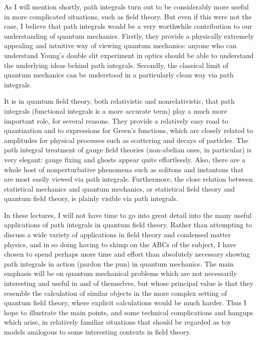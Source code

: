 \documentclass[12pt]{article}
\begin{document}
As I will mention shortly, path integrals turn out to be
  considerably more useful in more complicated situations, such as
  field theory. But even if this were not the case, I believe that
  path integrals would be a very worthwhile contribution to our
  understanding of quantum mechanics. Firstly, they provide a
  physically extremely appealing and intuitive way of viewing quantum
  mechanics: anyone who can understand Young's double slit experiment
  in optics should be able to understand the underlying ideas behind
  path integrals. Secondly, the classical limit of quantum mechanics
  can be understood in a particularly clean way via path integrals.

It is in quantum field theory, both relativistic and nonrelativistic,
that path integrals (functional integrals is a more accurate term)
play a much more important role, for several reasons. They provide a
relatively easy road to quantization and to expressions for Green's
functions, which are closely related to amplitudes for physical
processes such as scattering and decays of particles.  The path
integral treatment of gauge field theories (non-abelian ones, in
particular) is very elegant: gauge fixing and ghosts appear quite
effortlessly. Also, there are a whole host of nonperturbative
phenomena such as solitons and instantons that are most easily viewed
via path integrals.  Furthermore, the close relation between
statistical mechanics and quantum mechanics, or statistical field
theory and quantum field theory, is plainly visible via path
integrals.

In these lectures, I will not have time to go into great detail into
the many useful applications of path integrals in quantum field
theory.  Rather than attempting to discuss a wide variety of
applications in field theory and condensed matter physics, and in so
doing having to skimp on the ABCs of the subject, I have chosen to
spend perhaps more time and effort than absolutely necessary showing
path integrals in action (pardon the pun) in quantum mechanics. The
main emphasis will be on quantum mechanical problems which are not
necessarily interesting and useful
in and of themselves, but whose principal
value is that they resemble the calculation of similar objects in the
more complex setting of quantum field theory, where explicit
calculations would be much harder. Thus I hope to illustrate the main
points, and some technical complications and hangups which arise, in
relatively familiar situations that should be regarded as toy models
analogous to some interesting contexts in field theory.
\end{document}
